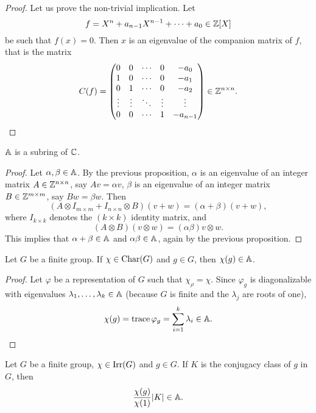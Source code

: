 \begin{proof}
    Let us prove the non-trivial implication. Let 
    \[
    f=X^n+a_{n-1}X^{n-1}+\cdots+a_0\in\mathbb{Z}[X]
    \]
    be such that $f(x)=0$. Then $x$ is an eigenvalue
    of the companion matrix of $f$, that is the matrix
    \[
    C(f)=
    \begin{pmatrix}
    0&0&\cdots &0&-a_{0}\\
    1&0&\cdots &0&-a_{1}\\
    0&1&\cdots &0&-a_{2}\\
    \vdots &\vdots &\ddots &\vdots &\vdots \\
    0&0&\cdots &1&-a_{{n-1}}
    \end{pmatrix}
    \in\mathbb{Z}^{n\times n}.\qedhere 
    \]
\end{proof}

\begin{theorem}
\label{thm:Asubring}
    $\mathbb{A}$ is a subring of $\mathbb{C}$. 
\end{theorem}

\begin{proof}
    Let $\alpha,\beta\in\mathbb{A}$. By the previous proposition, 
    $\alpha$ is an eigenvalue 
    of an integer matrix $A\in\mathbb{Z}^{n\times n}$, say
    $Av=\alpha v$, 
    $\beta$ is an eigenvalue of an integer matrix 
    $B\in\mathbb{Z}^{m\times m}$, say $Bw=\beta w$. Then
    \[
    (A\otimes I_{m\times m}+I_{n\times n}\otimes B)(v+w)
    =(\alpha+\beta)(v+w), 
    \]
    where $I_{k\times k}$ denotes the $(k\times k)$ identity 
    matrix, and
    \[
    (A\otimes B)(v\otimes w)=(\alpha\beta)v\otimes w.
    \]
    This implies that 
    $\alpha+\beta\in\mathbb{A}$ and $\alpha\beta\in\mathbb{A}$, again 
    by the previous proposition. 
\end{proof}

\begin{theorem}
\label{thm:A}
    Let $G$ be a finite group. If $\chi\in\operatorname{Char}(G)$ and
    $g\in G$, then $\chi(g)\in\mathbb{A}$. 
\end{theorem}

\begin{proof}
    Let $\varphi$ be a representation of $G$ such that 
    $\chi_\rho=\chi$. Since $\varphi_g$ is diagonalizable with
    eigenvalues $\lambda_1,\dots,\lambda_k\in\mathbb{A}$ (because
    $G$ is finite and the $\lambda_j$ are roots of one), 
    \[
    \chi(g)=\operatorname{trace}\varphi_g=\sum_{i=1}^k\lambda_i\in\mathbb{A}. \qedhere
    \]
\end{proof}

\begin{theorem}
    Let $G$ be a finite group, $\chi\in\operatorname{Irr}(G)$ and $g\in G$. 
    If $K$ is the conjugacy class of $g$ in $G$, then
    \[
    \frac{\chi(g)}{\chi(1)}|K|\in\mathbb{A}. 
    \]
\end{theorem}

